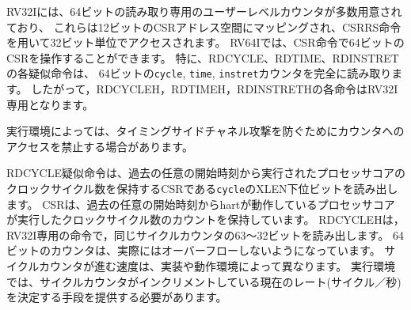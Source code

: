 \begin{comment}
RV32I provides a number of 64-bit read-only user-level counters, which
are mapped into the 12-bit CSR address space and accessed in 32-bit
pieces using CSRRS instructions.  In RV64I, the CSR instructions can
manipulate 64-bit CSRs.  In particular, the RDCYCLE, RDTIME, and
RDINSTRET pseudoinstructions read the full 64 bits of the {\tt cycle},
{\tt time}, and {\tt instret} counters.  Hence, the RDCYCLEH, RDTIMEH,
and RDINSTRETH instructions are RV32I-only.
\end{comment}

RV32Iには、64ビットの読み取り専用のユーザーレベルカウンタが多数用意されており、
これらは12ビットのCSRアドレス空間にマッピングされ、CSRRS命令を用いて32ビット単位でアクセスされます。
RV64Iでは、CSR命令で64ビットのCSRを操作することができます。 
特に、RDCYCLE、RDTIME、RDINSTRETの各疑似命令は、
64ビットの{\tt cycle}, {\tt time}, {\tt instret}カウンタを完全に読み取ります。
したがって，RDCYCLEH，RDTIMEH，RDINSTRETHの各命令はRV32I専用となります。

\begin{commentary}
\begin{comment}
Some execution environments might prohibit access to counters to
impede timing side-channel attacks.
\end{comment}
実行環境によっては、タイミングサイドチャネル攻撃を防ぐためにカウンタへのアクセスを禁止する場合があります。
\end{commentary}

\begin{comment}
The RDCYCLE pseudoinstruction reads the low XLEN bits of the {\tt
  cycle} CSR which holds a count of the number of clock cycles
executed by the processor core on which the hart is running from an
arbitrary start time in the past.  RDCYCLEH is an RV32I-only
instruction that reads bits 63--32 of the same cycle counter.  The
underlying 64-bit counter should never overflow in practice.  The rate
at which the cycle counter advances will depend on the implementation
and operating environment.  The execution environment should provide a
means to determine the current rate (cycles/second) at which the cycle
counter is incrementing.
\end{comment}

RDCYCLE疑似命令は、過去の任意の開始時刻から実行されたプロセッサコアのクロックサイクル数を保持するCSRである{\tt cycle}のXLEN下位ビットを読み出します。
CSRは、過去の任意の開始時刻からhartが動作しているプロセッサコアが実行したクロックサイクル数のカウントを保持しています。
RDCYCLEHは，RV32I専用の命令で，同じサイクルカウンタの63～32ビットを読み出します。
64ビットのカウンタは、実際にはオーバーフローしないようになっています。
サイクルカウンタが進む速度は、実装や動作環境によって異なります。
実行環境では、サイクルカウンタがインクリメントしている現在のレート(サイクル／秒)を決定する手段を提供する必要があります。

